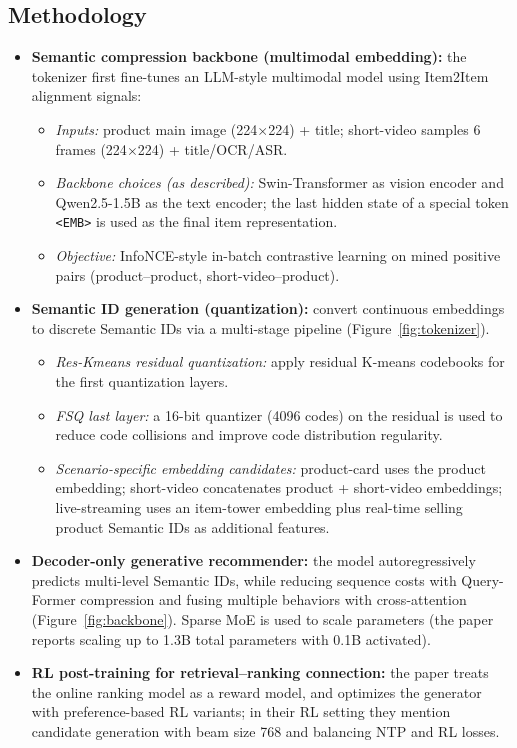 \documentclass{article}
\begin{document}
\subsection*{Methodology}
\begin{itemize}
  \item \textbf{Semantic compression backbone (multimodal embedding):} the tokenizer first fine-tunes an LLM-style multimodal model using Item2Item alignment signals:
    \begin{itemize}
      \item \emph{Inputs:} product main image (224$\times$224) + title; short-video samples 6 frames (224$\times$224) + title/OCR/ASR.
      \item \emph{Backbone choices (as described):} Swin-Transformer as vision encoder and Qwen2.5-1.5B as the text encoder; the last hidden state of a special token \texttt{<EMB>} is used as the final item representation.
      \item \emph{Objective:} InfoNCE-style in-batch contrastive learning on mined positive pairs (product--product, short-video--product).
    \end{itemize}

  \item \textbf{Semantic ID generation (quantization):} convert continuous embeddings to discrete Semantic IDs via a multi-stage pipeline (Figure~\ref{fig:tokenizer}).
    \begin{itemize}
      \item \emph{Res-Kmeans residual quantization:} apply residual K-means codebooks for the first quantization layers.
      \item \emph{FSQ last layer:} a 16-bit quantizer (4096 codes) on the residual is used to reduce code collisions and improve code distribution regularity.
      \item \emph{Scenario-specific embedding candidates:} product-card uses the product embedding; short-video concatenates product + short-video embeddings; live-streaming uses an item-tower embedding plus real-time selling product Semantic IDs as additional features.
    \end{itemize}

  \item \textbf{Decoder-only generative recommender:} the model autoregressively predicts multi-level Semantic IDs, while reducing sequence costs with Query-Former compression and fusing multiple behaviors with cross-attention (Figure~\ref{fig:backbone}). Sparse MoE is used to scale parameters (the paper reports scaling up to 1.3B total parameters with 0.1B activated).

  \item \textbf{RL post-training for retrieval--ranking connection:} the paper treats the online ranking model as a reward model, and optimizes the generator with preference-based RL variants; in their RL setting they mention candidate generation with beam size 768 and balancing NTP and RL losses.
\end{itemize}
\end{document}
